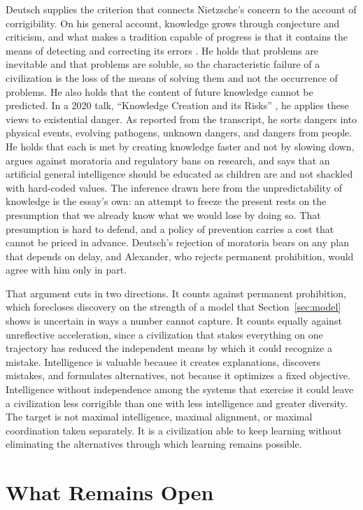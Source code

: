 \documentclass[11pt]{article}
\begin{document}
Deutsch supplies the criterion that connects Nietzsche's concern to the account of corrigibility. On his general account, knowledge grows through conjecture and criticism, and what makes a tradition capable of progress is that it contains the means of detecting and correcting its errors \cite{deutsch2011}. He holds that problems are inevitable and that problems are soluble, so the characteristic failure of a civilization is the loss of the means of solving them and not the occurrence of problems. He also holds that the content of future knowledge cannot be predicted. In a 2020 talk, ``Knowledge Creation and its Risks'' \cite{deutsch2020}, he applies these views to existential danger. As reported from the transcript, he sorts dangers into physical events, evolving pathogens, unknown dangers, and dangers from people. He holds that each is met by creating knowledge faster and not by slowing down, argues against moratoria and regulatory bans on research, and says that an artificial general intelligence should be educated as children are and not shackled with hard-coded values. The inference drawn here from the unpredictability of knowledge is the essay's own: an attempt to freeze the present rests on the presumption that we already know what we would lose by doing so. That presumption is hard to defend, and a policy of prevention carries a cost that cannot be priced in advance. Deutsch's rejection of moratoria bears on any plan that depends on delay, and Alexander, who rejects permanent prohibition, would agree with him only in part.

That argument cuts in two directions. It counts against permanent prohibition, which forecloses discovery on the strength of a model that Section~\ref{sec:model} shows is uncertain in ways a number cannot capture. It counts equally against unreflective acceleration, since a civilization that stakes everything on one trajectory has reduced the independent means by which it could recognize a mistake. Intelligence is valuable because it creates explanations, discovers mistakes, and formulates alternatives, not because it optimizes a fixed objective. Intelligence without independence among the systems that exercise it could leave a civilization less corrigible than one with less intelligence and greater diversity. The target is not maximal intelligence, maximal alignment, or maximal coordination taken separately. It is a civilization able to keep learning without eliminating the alternatives through which learning remains possible.

\section{What Remains Open}\label{sec:open}
\end{document}
